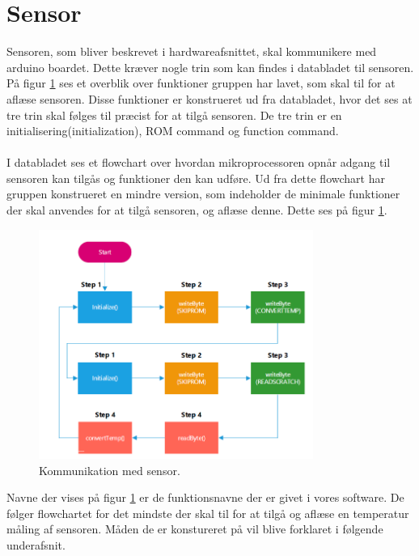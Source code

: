 \section{Sensor}
Sensoren, som bliver beskrevet i hardwareafsnittet, skal kommunikere med arduino boardet. Dette kræver nogle trin som kan findes i databladet til sensoren. På figur \ref{sensor_kom} ses et overblik over funktioner gruppen har lavet, som skal til for at aflæse sensoren. Disse funktioner er konstrueret ud fra databladet, hvor det ses at tre trin skal følges til præcist for at tilgå sensoren. De tre trin er en initialisering(initialization), ROM command og function command.
\\
\\
I databladet ses et flowchart over hvordan mikroprocessoren opnår adgang til sensoren kan tilgås og funktioner den kan udføre. Ud fra dette flowchart har gruppen konstrueret en mindre version, som indeholder de minimale funktioner der skal anvendes for at tilgå sensoren, og aflæse denne. Dette ses på figur \ref{sensor_kom}.

\begin{figure}[h!]
  \centering
  \includegraphics[width=0.8\textwidth]{figures/sensor_communication.png}
  \caption{Kommunikation med sensor.}
  \label{sensor_kom}
\end{figure}

Navne der vises på figur \ref{sensor_kom} er de funktionsnavne der er givet i vores software. De følger flowchartet for det mindste der skal til for at tilgå og aflæse en temperatur måling af sensoren. Måden de er konstureret på vil blive forklaret i følgende underafsnit.


